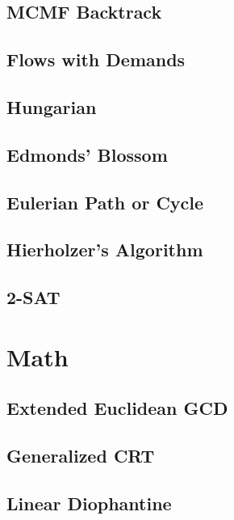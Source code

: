 \subsection{MCMF Backtrack}

\subsection{Flows with Demands}

\subsection{Hungarian}

\subsection{Edmonds' Blossom}

\subsection{Eulerian Path or Cycle}

\subsection{Hierholzer's Algorithm}

\subsection{2-SAT}

\section{Math}
\subsection{Extended Euclidean GCD}

\subsection{Generalized CRT}

\subsection{Linear Diophantine}

